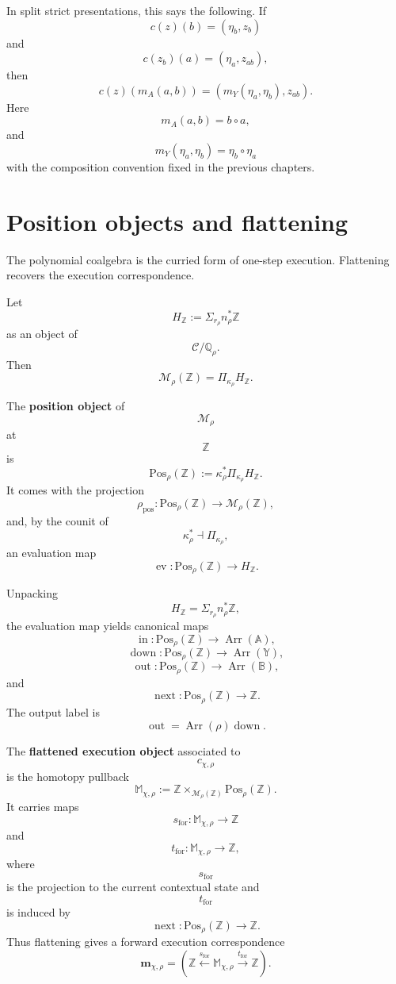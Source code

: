 In split strict presentations, this says the following.  If
\[
c(z)(b)=(\eta_b,z_b)
\]
and
\[
c(z_b)(a)=(\eta_a,z_{ab}),
\]
then
\[
c(z)(m_A(a,b))
=
(m_Y(\eta_a,\eta_b),z_{ab}).
\]
Here
\[
m_A(a,b)=b\circ a,
\]
and
\[
m_Y(\eta_a,\eta_b)=\eta_b\circ\eta_a
\]
with the composition convention fixed in the previous chapters.

\section{Position objects and flattening}
\label{sec:derived-poly-position-flattening}

The polynomial coalgebra is the curried form of one-step execution.  Flattening
recovers the execution correspondence.

Let
\[
H_{\mathbb Z}
:=
\Sigma_{r_\rho}n_\rho^\ast\mathbb Z
\]
as an object of
\[
\mathcal C/\mathbb Q_\rho.
\]
Then
\[
\mathcal M_\rho(\mathbb Z)
=
\Pi_{\kappa_\rho}H_{\mathbb Z}.
\]

\begin{definition}
\label{def:derived-poly-position-object}
The \textbf{position object} of
\[
\mathcal M_\rho
\]
at
\[
\mathbb Z
\]
is
\[
\mathrm{Pos}_{\rho}(\mathbb Z)
:=
\kappa_\rho^\ast\Pi_{\kappa_\rho}H_{\mathbb Z}.
\]
It comes with the projection
\[
\rho_{\mathrm{pos}}:
\mathrm{Pos}_{\rho}(\mathbb Z)
\to
\mathcal M_\rho(\mathbb Z),
\]
and, by the counit of
\[
\kappa_\rho^\ast\dashv\Pi_{\kappa_\rho},
\]
an evaluation map
\[
\operatorname{ev}:
\mathrm{Pos}_{\rho}(\mathbb Z)
\to
H_{\mathbb Z}.
\]
\end{definition}

Unpacking
\[
H_{\mathbb Z}=\Sigma_{r_\rho}n_\rho^\ast\mathbb Z,
\]
the evaluation map yields canonical maps
\[
\operatorname{in}:
\mathrm{Pos}_{\rho}(\mathbb Z)\to\operatorname{Arr}(\mathbb A),
\]
\[
\operatorname{down}:
\mathrm{Pos}_{\rho}(\mathbb Z)\to\operatorname{Arr}(\mathbb Y),
\]
\[
\operatorname{out}:
\mathrm{Pos}_{\rho}(\mathbb Z)\to\operatorname{Arr}(\mathbb B),
\]
and
\[
\operatorname{next}:
\mathrm{Pos}_{\rho}(\mathbb Z)\to\mathbb Z.
\]
The output label is
\[
\operatorname{out}
=
\operatorname{Arr}(\rho)\operatorname{down}.
\]

\begin{definition}
\label{def:derived-poly-flattened-execution-object}
The \textbf{flattened execution object} associated to
\[
c_{\chi,\rho}
\]
is the homotopy pullback
\[
\mathbb M_{\chi,\rho}
:=
\mathbb Z
\times_{\mathcal M_\rho(\mathbb Z)}
\mathrm{Pos}_{\rho}(\mathbb Z).
\]
It carries maps
\[
s_{\mathrm{for}}:\mathbb M_{\chi,\rho}\to\mathbb Z
\]
and
\[
t_{\mathrm{for}}:\mathbb M_{\chi,\rho}\to\mathbb Z,
\]
where
\[
s_{\mathrm{for}}
\]
is the projection to the current contextual state and
\[
t_{\mathrm{for}}
\]
is induced by
\[
\operatorname{next}:
\mathrm{Pos}_{\rho}(\mathbb Z)\to\mathbb Z.
\]
Thus flattening gives a forward execution correspondence
\[
\mathbf m_{\chi,\rho}
=
\left(
\mathbb Z
\xleftarrow{s_{\mathrm{for}}}
\mathbb M_{\chi,\rho}
\xrightarrow{t_{\mathrm{for}}}
\mathbb Z
\right).
\]
\end{definition}

